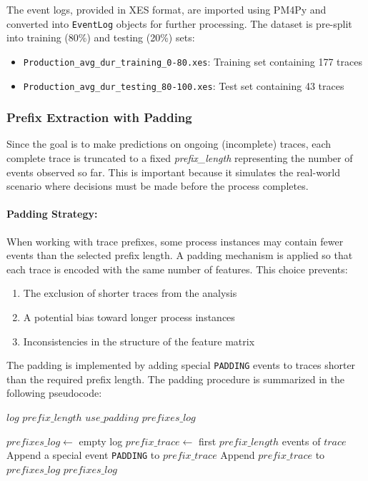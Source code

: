 \documentclass{article}
\begin{document}
The event logs, provided in XES format, are imported using PM4Py and converted into \texttt{EventLog} objects for further processing. The dataset is pre-split into training (80\%) and testing (20\%) sets:
\begin{itemize}
    \item \texttt{Production\_avg\_dur\_training\_0-80.xes}: Training set containing 177 traces
    \item \texttt{Production\_avg\_dur\_testing\_80-100.xes}: Test set containing 43 traces
\end{itemize}

\subsubsection{Prefix Extraction with Padding}

Since the goal is to make predictions on ongoing (incomplete) traces, each complete trace is truncated to a fixed \textit{prefix\_length} representing the number of events observed so far. This is important because it simulates the real-world scenario where decisions must be made before the process completes.

\paragraph{Padding Strategy:}
When working with trace prefixes, some process instances may contain fewer events than the selected prefix length. A padding mechanism is applied so that each trace is encoded with the same number of features.
This choice prevents:
\begin{enumerate}
\item The exclusion of shorter traces from the analysis
\item A potential bias toward longer process instances
\item Inconsistencies in the structure of the feature matrix
\end{enumerate}

\noindent
The padding is implemented by adding special \texttt{PADDING} events to traces shorter than the required prefix length. The padding procedure is summarized in the following pseudocode:
\begin{algorithm}[H]
\caption{Prefix Creation with Padding}
\label{alg:prefix-padding}
\begin{algorithmic}[1]
\Require $log$ 
\Require $prefix\_length$ 
\Require $use\_padding$ 
\Ensure $prefixes\_log$ 

\State $prefixes\_log \gets$ empty log
    \State $prefix\_trace \gets$ first $prefix\_length$ events of $trace$
            \State Append a special event \texttt{PADDING} to $prefix\_trace$
        \EndWhile
    \EndIf
    \State Append $prefix\_trace$ to $prefixes\_log$
\EndFor
\State \Return $prefixes\_log$
\end{algorithmic}
\end{algorithm}
\end{document}
